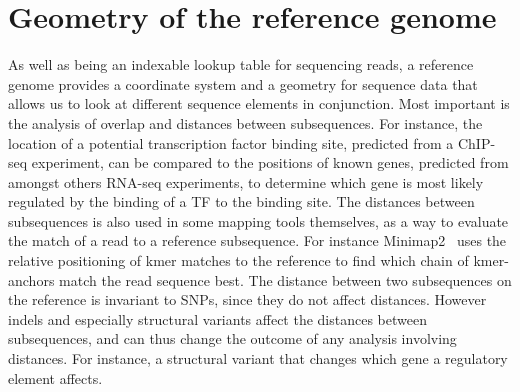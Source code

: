 \section{Geometry of the reference genome}
As well as being an indexable lookup table for sequencing reads, a reference genome provides a coordinate system and a geometry for sequence data that allows us to look at different sequence elements in conjunction. 
Most important is the analysis of overlap and distances between subsequences.
For instance, the location of a  potential transcription factor binding site, predicted from a ChIP-seq experiment, can be compared to the positions of known genes, predicted from amongst others RNA-seq experiments, to determine which gene is most likely regulated by the binding of a TF to the binding site.
The distances between subsequences is also used in some mapping tools themselves, as a way to evaluate the match of a read to a reference subsequence.
For instance Minimap2~\cite{minimap2} uses the relative positioning of kmer matches to the reference to find which chain of kmer-anchors match the read sequence best.
The distance between two subsequences on the reference is invariant to SNPs, since they do not affect distances.
However indels and especially structural variants affect the distances between subsequences, and can thus change the outcome of any analysis involving distances.
For instance, a structural variant that changes which gene a regulatory element affects. 


